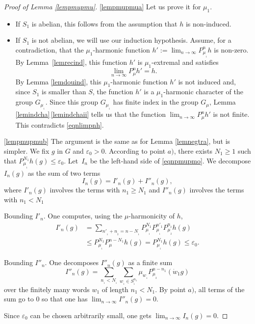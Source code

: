 \documentclass[JEP,XML,SOM,Unicode]{cedram}
\theoremstyle{definition}
\let\eps\varepsilon
\let\ra\to
\begin{document}
\skpt
\begin{proof}[Proof of Lemma \ref{lempmupmu}]
\eqref{lempmupmua}
Let us prove it for $\mu_1$.

\begin{itemize}
\item
If $S_1$ is abelian, this follows from the assumption that $h$ is non-induced.

\item
If $S_1$ is not abelian,
we will use our induction hypothesis. Assume, for a contradiction, that
the $\mu_1$-harmonic function $h':=\lim_{n\ra\infty}P^{n}_{\mu_{_1}}h$
is non-zero. By Lemma~\ref{lemrecind},
this function $h'$ is $\mu_1$-extremal and satisfies
\begin{equation}
\label{eqnlimpnh}
\lim_{n\ra\infty}P^{n}_{\mu}h'=h.
\end{equation}
By Lemma \ref{lemdouind}, this $\mu_1$-harmonic function $h'$ is not induced and,
since $S_1$ is smaller than $S$,
the function $h'$ is a $\mu_1$-harmonic character
of the group $G_{\mu_{_1}}$.
Since this group $G_{\mu_{_1}}$ has finite index in the group $G_\mu$, Lemma \ref{lemindcha}\,\eqref{lemindchaii}
tells us that the function $\lim_{n\ra\infty}P^{n}_{\mu}h'$ is not finite.
This contradicts \eqref{eqnlimpnh}.
\end{itemize}

\eqref{lempmupmub}
The argument is the same as for Lemma \ref{lemnegtra}, but is simpler.
We fix $g$ in $G$ and $\eps_0>0$.
According to point $a)$, there exists $N_1\geq 1$ such that
$P^{N_1}_{\mu_{_1}}h(g)\leq \eps_0$.
Let~$I_n$ be the left-hand side of \eqref{eqnpmupmo}.
We decompose $I_n(g)$
as the sum of two terms
\[
I_n(g)=I'_n(g)+I''_n(g),
\]
where $I'_n(g)$ involves the terms with $n_1\geq N_1$
and $I''_n(g)$ involves the terms with $n_1 < N_1$

Bounding $I'_n$. One computes, using the $\mu$-harmonicity of $h$,
\begin{align*}
I'_{n}(g)&=
\sum_{n'_{_1}+n_{_2}=n-N_{_1}}
P^{N_1}_{\mu_{_1}}P^{n'_1}_{\mu_{_1}}P^{n_{_2}}_{\mu_{_2}}h(g)\\
&\leq
P^{N_1}_{\mu_{_1}}P^{n-N_1}_{\mu}h(g)
= P^{N_1}_{\mu_{_1}}h(g)\leq \eps_0.
\end{align*}

Bounding $I''_n$. One decomposes $I''_n(g)$ as a finite sum
\[
I''_{n}(g)=\sum_{n_{_1}<N_{_1}}\sum_{w_{_1}\in S_{_1}^{n_1}} \mu_{w_{_1}}P^{n-n_1}_{\mu_{_2}}(\dot{w}_{1}g)
\]
over the finitely many words $w_1$ of length $n_1<N_1$.
By point $a)$, all terms of the sum go to $0$ so that one has
$\lim_{n\ra\infty}I''_{n}(g)=0$.

Since $\eps_0$ can be chosen arbitrarily small, one gets
$\lim_{n\ra\infty}I_{n}(g)=0$.
\end{proof}
\end{document}
